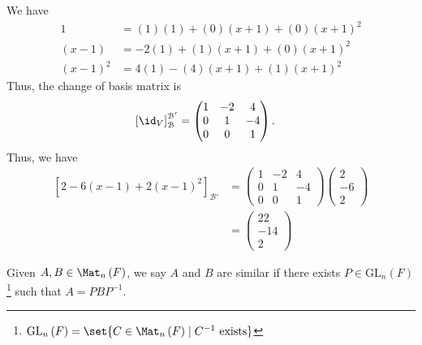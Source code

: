 \documentclass[10pt]{mypackage}
\begin{document}
\begin{solution}
  We have
  \begin{align*}
    1 &= (1)(1) + (0)\left(x+1\right) + (0)\left(x+1\right)^2\\
    \left(x-1\right) &= -2\left(1\right) + (1)\left(x+1\right) + \left(0\right)\left(x+1\right)^2\\
    \left(x-1\right)^2 &=  4(1) -(4)\left(x+1\right) + (1)\left(x+1\right)^2
  \end{align*}
  Thus, the change of basis matrix is
  \begin{align*}
    \left[\id_{V}\right]_{\mathcal{B}}^{\mathcal{B}'} &= \begin{pmatrix}1 & -2 & 4 \\ 0 & 1 & -4 \\ 0 & 0 & 1\end{pmatrix}.
  \end{align*}
  Thus, we have
  \begin{align*}
    \left[2 - 6\left(x-1\right) + 2\left(x-1\right)^2\right]_{\mathcal{B}'} &= \begin{pmatrix}1 & -2 & 4\\ 0 & 1 & -4 \\ 0 & 0 & 1\end{pmatrix} \begin{pmatrix}2\\-6\\2\end{pmatrix}\\
                                                                            &= \begin{pmatrix}22\\-14\\2\end{pmatrix}
  \end{align*}
\end{solution}
\begin{definition}
  Given $A,B\in \Mat_{n}\left(F\right)$, we say $A$ and $B$ are similar if there exists $P\in \text{GL}_{n}\left(F\right)$\footnote{$\text{GL}_{n}\left(F\right) = \set{C\in \Mat_{n}\left(F\right)\mid C^{-1}\text{ exists}}$} such that $A = PBP^{-1}$.
\end{definition}
\end{document}
